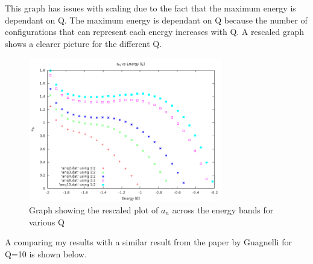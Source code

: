 This graph has issues with scaling due to the fact that the maximum energy is dependant on Q.
The maximum energy is dependant on Q because the number of configurations that can represent each energy increases with Q.
A rescaled graph shows a clearer picture for the different Q.

\begin{figure}[H]
\centering
\includegraphics[width=0.75\textwidth]{4-Results/a_n-rescaled.png}
\caption{Graph showing the rescaled plot of $a_n$ across the energy bands for various Q}
\end{figure}

A comparing my results with a similar result from the paper by Guagnelli for Q=10 is shown below.

